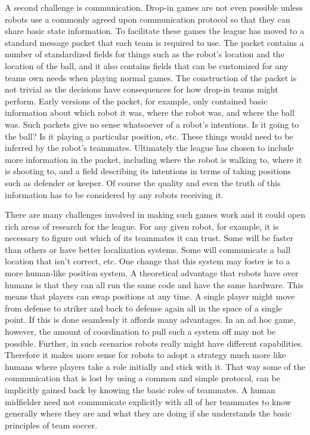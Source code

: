 \documentclass{llncs}
\begin{document}
A second challenge is communication. Drop-in games are not even possible
unless robots use a commonly agreed upon communication
protocol so that they can share basic state information.  To facilitate these
games the league has moved to a standard message packet that each team
is required to use. The packet contains a number of standardized fields
for things such as the robot's location and the location of the ball, and it
also contains fields that can be customized for any teams own needs when
playing normal games. The construction of the packet is not trivial as
the decisions have consequences for how drop-in teams might perform.
Early versions of the packet, for example, only contained basic information
about which robot it was, where the robot was, and where the ball was. Such packets give no
sense whatsoever of a robot's intentions. Is it going to the ball? Is it playing
a particular position, etc. These things would need to be inferred by the
robot's teammates. Ultimately the league has chosen to include more information
in the packet, including where the robot is walking to, where it is shooting
to, and a field describing its intentions in terms of taking positions such
as defender or keeper. Of course the quality and even the truth of this
information has to be considered by any robots receiving it.

There are many challenges involved in making such games work and
it could open rich areas of research for the league.
For any given robot, for example, it is necessary to figure out which
of its teammates it can trust. Some will be faster than others or have
better localization systems. Some will communicate a ball location
that isn't correct, etc. One change that this system may foster is
to a more human-like position system. A theoretical advantage that robots
have over humans is that they can all run the same code and have
the same hardware. This means that players can swap positions at any
time. A single player might move from defense to striker and back to
defense again all in the space of a single point. If this is done seamlessly
it affords many advantages. In an ad hoc game, however, the amount of
coordination to pull such a system off may not be possible. 
Further, in such scenarios robots really might have different capabilities.
Therefore it makes
more sense for robots to adopt a strategy much more like humans where
players take a role initially and stick with it. That way some of the
communication that is lost by using a common and simple protocol, can
be implicitly gained back by knowing the basic roles of teammates.
A human midfielder need not communicate explicitly with all of her
teammates to know generally where they are and what they are doing
if she understands the basic principles of team soccer.
\end{document}
